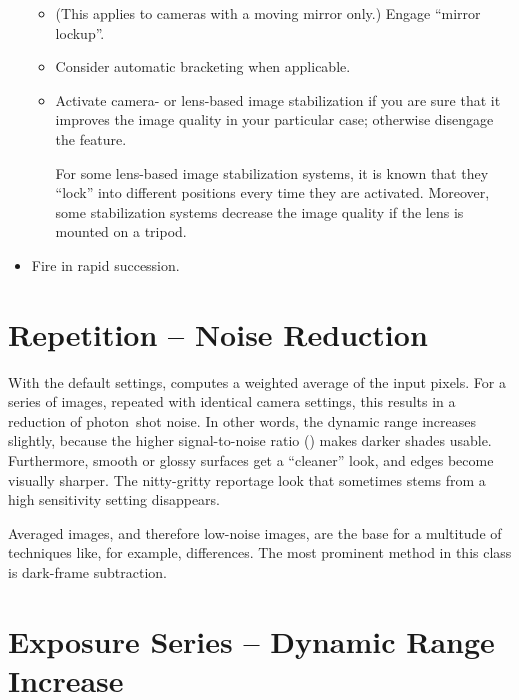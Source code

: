 \begin{itemize}
\begin{itemize}
  \item
    (This applies to cameras with a moving mirror only.)  Engage ``mirror lockup''.

  \item
    Consider automatic bracketing when applicable.

  \item
    Activate camera- or lens-based image stabilization if you are sure that it improves the
    image quality in your particular case; otherwise disengage the feature.

    For some lens-based image stabilization systems, it is known that they ``lock'' into
    different positions every time they are activated.  Moreover, some stabilization systems
    decrease the image quality if the lens is mounted on a tripod.
  \end{itemize}

\item
  Fire in rapid succession.
\end{itemize}




\section[Repetition -- Noise Reduction]{\label{sec:repetition}%
  Repetition -- Noise Reduction}


With the default settings, \App{} computes a weighted average of the input pixels.  For a series
of images, repeated with identical camera settings, this results in a reduction of photon~shot
noise.  In other words, the dynamic range increases slightly, because the higher signal-to-noise
ratio () makes darker shades usable.  Furthermore, smooth or glossy surfaces get a
``cleaner'' look, and edges become visually sharper.  The nitty-gritty reportage look that
sometimes stems from a high sensitivity setting disappears.

Averaged images, and therefore low-noise images, are the base for a multitude of techniques
like, for example, differences.  The most prominent method in this class is dark-frame
subtraction.


\section[Exposure Series -- Dynamic Range Increase]{\label{sec:exposure-series--dynamic-range-increase}%
  Exposure Series -- Dynamic Range Increase}

